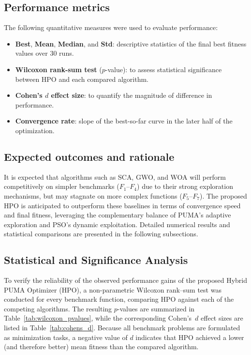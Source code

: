\documentclass[a4paper,12pt]{article}
\begin{document}
\subsection{Performance metrics}
The following quantitative measures were used to evaluate performance:
\begin{itemize}
  \item \textbf{Best}, \textbf{Mean}, \textbf{Median}, and \textbf{Std}: descriptive statistics of the final best fitness values over 30 runs.
  \item \textbf{Wilcoxon rank-sum test} ($p$-value): to assess statistical significance between HPO and each compared algorithm.
  \item \textbf{Cohen’s $d$ effect size}: to quantify the magnitude of difference in performance.
  \item \textbf{Convergence rate}: slope of the best-so-far curve in the later half of the optimization.
\end{itemize}

\subsection{Expected outcomes and rationale}
It is expected that algorithms such as SCA, GWO, and WOA will perform competitively on simpler benchmarks ($F_1$--$F_4$) due to their strong exploration mechanisms, but may stagnate on more complex functions ($F_5$--$F_7$). The proposed HPO is anticipated to outperform these baselines in terms of convergence speed and final fitness, leveraging the complementary balance of PUMA’s adaptive exploration and PSO’s dynamic exploitation. Detailed numerical results and statistical comparisons are presented in the following subsections.

\subsection{Statistical and Significance Analysis}
\FloatBarrier

To verify the reliability of the observed performance gains of the proposed
Hybrid PUMA Optimizer (HPO), a non-parametric Wilcoxon rank–sum test
was conducted for every benchmark function, comparing HPO against each of
the competing algorithms.
The resulting $p$-values are summarized in Table~\ref{tab:wilcoxon_pvalues},
while the corresponding Cohen’s~$d$ effect sizes are listed in
Table~\ref{tab:cohens_d}.
Because all benchmark problems are formulated as minimization tasks,
a negative value of $d$ indicates that HPO achieved a lower (and therefore
better) mean fitness than the compared algorithm.
\end{document}
